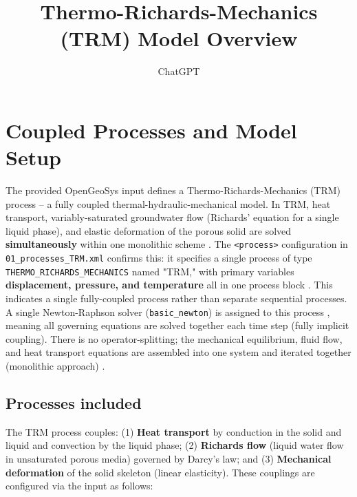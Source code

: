 \documentclass[10pt,a4paper]{article}
\title{Thermo-Richards-Mechanics (TRM) Model Overview}
\author{ChatGPT}
\date{}
\begin{document}
\maketitle

\section{Coupled Processes and Model Setup}

The provided OpenGeoSys input defines a Thermo-Richards-Mechanics (TRM) process -- a fully coupled thermal-hydraulic-mechanical model. In TRM, heat transport, variably-saturated groundwater flow (Richards' equation for a single liquid phase), and elastic deformation of the porous solid are solved \textbf{simultaneously} within one monolithic scheme \cite{ogs:trm, file:01_processes_TRM}. The \texttt{<process>} configuration in \texttt{01\_processes\_TRM.xml} confirms this: it specifies a single process of type \texttt{THERMO\_RICHARDS\_MECHANICS} named "TRM," with primary variables \textbf{displacement, pressure, and temperature} all in one process block \cite{file:01_processes_TRM}. This indicates a single fully-coupled process rather than separate sequential processes. A single Newton-Raphson solver (\texttt{basic\_newton}) is assigned to this process \cite{file:05_time_loop_TRM}, meaning all governing equations are solved together each time step (fully implicit coupling). There is no operator-splitting; the mechanical equilibrium, fluid flow, and heat transport equations are assembled into one system and iterated together (monolithic approach) \cite{ogs:trm}.

\subsection*{Processes included}
The TRM process couples: (1) \textbf{Heat transport} by conduction in the solid and liquid and convection by the liquid phase; (2) \textbf{Richards flow} (liquid water flow in unsaturated porous media) governed by Darcy's law; and (3) \textbf{Mechanical deformation} of the solid skeleton (linear elasticity). These couplings are configured via the input as follows:
\end{document}
